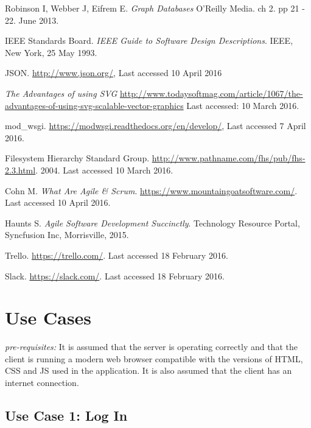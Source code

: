 \documentclass[12pt,onecolumn]{article}
\begin{document}
\begin{thebibliography}{1}
		 Robinson I, Webber J, Eifrem E. \emph{Graph Databases} O'Reilly Media. ch 2. pp 21 - 22. June 2013.
		
		 IEEE Standards Board. \emph{IEEE Guide to Software Design Descriptions}. IEEE, New York, 25 May 1993.
		
		 JSON. \url{http://www.json.org/}, Last accessed 10 April 2016
		
		  \emph{The Advantages of using SVG} \url{http://www.todaysoftmag.com/article/1067/the-advantages-of-using-svg-scalable-vector-graphics} Last accessed: 10 March 2016.
		
		 mod\_wsgi. \url{https://modwsgi.readthedocs.org/en/develop/}, Last accessed 7 April 2016.
		
		 Filesystem Hierarchy Standard Group. \url{http://www.pathname.com/fhs/pub/fhs-2.3.html}. 2004. Last accessed 10 March 2016.
		
		 Cohn M. \emph{What Are Agile \& Scrum}. \url{https://www.mountaingoatsoftware.com/}. Last accessed 10 April 2016.
		
		 Haunts S. \emph{Agile Software Development Succinctly}. Technology Resource Portal, Syncfusion Inc, Morrisville, 2015.
		
		 Trello. \url{https://trello.com/}. Last accessed 18 February 2016.
		
		 Slack. \url{https://slack.com/}. Last accessed 18 February 2016.
		
		
	\end{thebibliography}
	
	\newpage
	
	\appendix
	
	\section{Use Cases} \label{moreusecase}
	
	\emph{pre-requisites:} It is assumed that the server is operating correctly and that the client is running a modern web browser compatible with the versions of HTML, CSS and JS used in the application. It is also assumed that the client has an internet connection.
	
	\subsection{Use Case 1: Log In}
\end{document}
